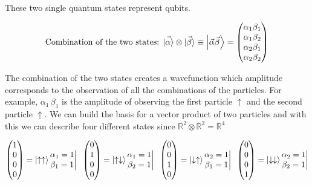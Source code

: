 	These two single quantum states represent qubits.

	$$\text{Combination of the two states: }\vec{\ket{\alpha}}\otimes\vec{\ket{\beta}}\equiv{\ket{\vec{\alpha}\vec{\beta}}}=\begin{pmatrix}\alpha_1\beta_1\\\alpha_1\beta_2\\\alpha_2\beta_1\\\alpha_2\beta_2\end{pmatrix}$$

	The combination of the two states creates a wavefunction which amplitude corresponds to the observation of all the combinations of the particles.
For example, $\alpha_1\,\beta_1$ is the amplitude of observing the first particle $\uparrow$ and the second particle $\uparrow$.
	We can build the basis for a vector product of two particles and with this we can describe four different states since $\mathbb{R}^2\otimes\mathbb{R}^2=\mathbb{R}^4$

	$$\begin{pmatrix}1\\0\\0\\0\end{pmatrix}=\ket{\uparrow\uparrow}\begin{matrix}\alpha_1=1\\\beta_1=1\end{matrix}\bigg| \;\;\begin{pmatrix}0\\1\\0\\0\end{pmatrix}=\ket{\uparrow\downarrow}\begin{matrix}\alpha_1=1\\\beta_2=1\end{matrix}\bigg| \;\;\begin{pmatrix}0\\0\\1\\0\end{pmatrix}=\ket{\downarrow\uparrow}\begin{matrix}\alpha_2=1\\\beta_1=1\end{matrix}\bigg| \;\;\begin{pmatrix}0\\0\\0\\1\end{pmatrix}=\ket{\downarrow\downarrow}\begin{matrix}\alpha_2=1\\\beta_2=1\end{matrix}\bigg|$$

